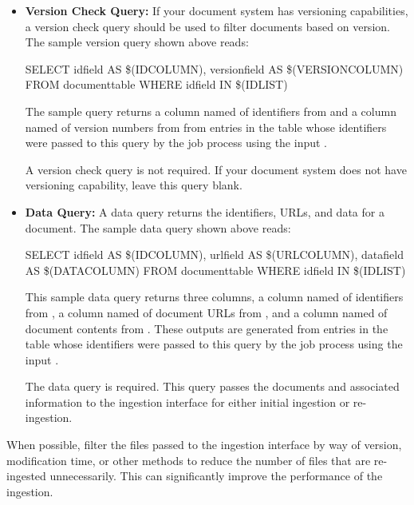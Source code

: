 \begin{itemize}


\item \textbf{Version Check Query:} If your document system has
versioning capabilities, a version check query should be used to
filter documents based on version. The sample version query shown
above reads:

\begin{console}
SELECT idfield AS \$(IDCOLUMN), versionfield AS \$(VERSIONCOLUMN) FROM
documenttable WHERE idfield IN \$(IDLIST)
\end{console}

The sample query returns a column
named  of identifiers from  and a
column named  of version numbers from
 from entries in the table 
whose identifiers were passed to this query by the job process using
the input .

A version check query is not required. If your document system does
not have versioning capability, leave this query blank.

\item \textbf{Data Query:} A data query returns the identifiers, URLs,
and data for a document. The sample data query shown above reads:

\begin{console}
SELECT idfield AS \$(IDCOLUMN), urlfield AS \$(URLCOLUMN), datafield AS
\$(DATACOLUMN) FROM documenttable WHERE idfield IN \$(IDLIST)
\end{console}

This sample data query returns three columns, a column named\linebreak
{} of identifiers from , a column
named  of document URLs from ,
and a column named  of document contents from
. These outputs are generated from entries in the table
 whose identifiers were passed to this query by
the job process using the input .

The data query is required. This query passes the documents and
associated information to the ingestion interface for either initial
ingestion or re-ingestion.

\end{itemize}

When possible, filter the files passed to the ingestion interface by
way of version, modification time, or other methods to reduce the
number of files that are re-ingested unnecessarily. This can
significantly improve the performance of the ingestion.

